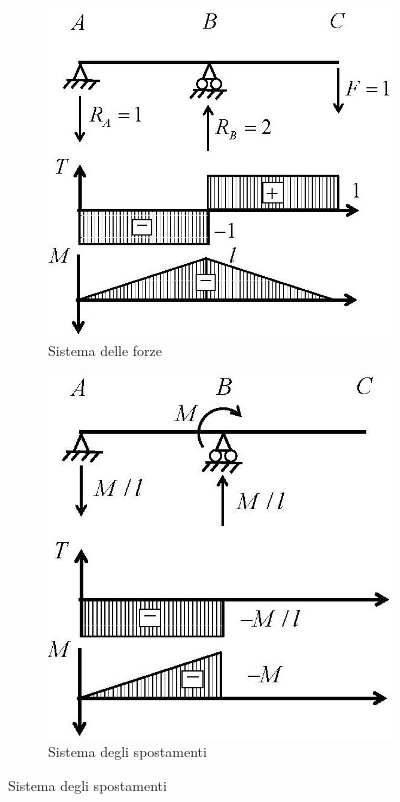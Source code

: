 \documentclass{article}
\begin{document}
\begin{adjustwidth}{2in}{}
\begin{figure}[H]
	\centering
	\begin{subfigure}[b]{0.3\textwidth}
	\includegraphics[width=\textwidth]{"immagini/1.PARTE8_Pagina_65 (2)"} 	\caption{Sistema delle forze}
	\end{subfigure}
\hspace{1cm}
	\begin{subfigure}[b]{0.3\textwidth}
	\includegraphics[width=\textwidth]{"immagini/1.PARTE8_Pagina_65"} 	\caption{Sistema degli spostamenti}	
	\end{subfigure}	
\end{figure}


\end{adjustwidth}
\end{document}
